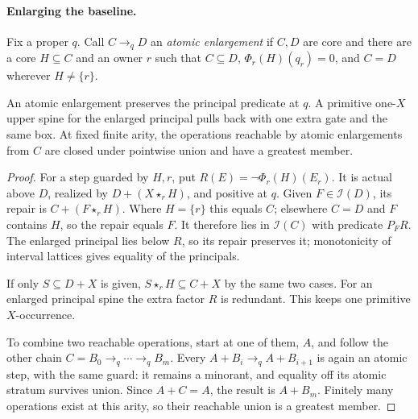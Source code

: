 \paragraph{Enlarging the baseline.}
Fix a proper $q$. Call $C\longrightarrow_q D$ an \emph{atomic
enlargement} if $C,D$ are core and there are a core $H\subseteq C$
and an owner $r$ such that $C\subseteq D$, $\Phi_r(H)(q_r)=0$,
and $C=D$ wherever $H\ne\{r\}$.

\begin{lemma}
\label{core:lem:atomic-repair}
An atomic enlargement preserves the principal predicate at $q$.
A primitive one-$X$ upper spine for the enlarged principal pulls
back with one extra gate and the same box. At fixed finite arity,
the operations reachable by atomic enlargements from $C$ are closed
under pointwise union and have a greatest member.
\end{lemma}
\begin{proof}
For a step guarded by $H,r$, put $R(E)=\neg\Phi_r(H)(E_r)$.
It is actual above $D$, realized by $D+(X\star_r H)$, and positive
at $q$. Given $F\in\mathcal I(D)$, its repair is
$C+(F\star_r H)$. Where $H=\{r\}$ this equals $C$; elsewhere
$C=D$ and $F$ contains $H$, so the repair equals $F$.
It therefore lies in $\mathcal I(C)$ with predicate $P_FR$.
The enlarged principal lies below $R$, so its repair preserves it;
monotonicity of interval lattices gives equality of the principals.

If only $S\subseteq D+X$ is given, $S\star_r H\subseteq C+X$
by the same two cases. For an enlarged principal spine the extra
factor $R$ is redundant. This keeps one primitive $X$-occurrence.

To combine two reachable operations, start at one of them, $A$,
and follow the other chain $C=B_0\longrightarrow_q\cdots
\longrightarrow_q B_m$. Every $A+B_i\longrightarrow_q A+B_{i+1}$
is again an atomic step, with the same guard: it remains a minorant,
and equality off its atomic stratum survives union.
Since $A+C=A$, the result is $A+B_m$. Finitely many operations
exist at this arity, so their reachable union is a greatest member.
\end{proof}

